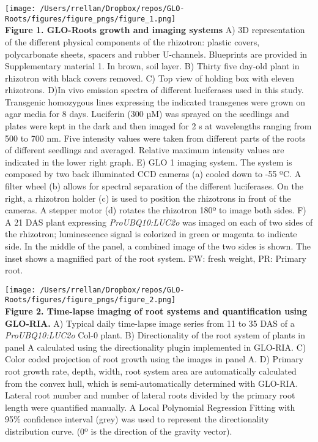 \documentclass[]{article}
\begin{document}
\texttt{[image: /Users/rrellan/Dropbox/repos/GLO-Roots/figures/figure\_pngs/figure\_1.png]}\\\textbf{Figure
1. GLO-Roots growth and imaging systems} A) 3D representation of the
different physical components of the rhizotron: plastic covers,
polycarbonate sheets, spacers and rubber U-channels. Blueprints are
provided in Supplementary material 1. In brown, soil layer. B) Thirty
five day-old plant in rhizotron with black covers removed. C) Top view
of holding box with eleven rhizotrons. D)In vivo emission spectra of
different luciferases used in this study. Transgenic homozygous lines
expressing the indicated transgenes were grown on agar media for 8 days.
Luciferin (300 µM) was sprayed on the seedlings and plates were kept in
the dark and then imaged for 2 s at wavelengths ranging from 500 to 700
nm. Five intensity values were taken from different parts of the roots
of different seedlings and averaged. Relative maximum intensity values
are indicated in the lower right graph. E) GLO 1 imaging system. The
system is composed by two back illuminated CCD cameras (a) cooled down
to -55 ºC. A filter wheel (b) allows for spectral separation of the
different luciferases. On the right, a rhizotron holder (c) is used to
position the rhizotrons in front of the cameras. A stepper motor (d)
rotates the rhizotron 180º to image both sides. F) A 21 DAS plant
expressing \emph{ProUBQ10:LUC2o} was imaged on each of two sides of the
rhizotron; luminescence signal is colorized in green or magenta to
indicate side. In the middle of the panel, a combined image of the two
sides is shown. The inset shows a magnified part of the root system. FW:
fresh weight, PR: Primary root.

\pagebreak

\texttt{[image: /Users/rrellan/Dropbox/repos/GLO-Roots/figures/figure\_pngs/figure\_2.png]}\\\textbf{Figure
2. Time-lapse imaging of root systems and quantification using GLO-RIA.}
A) Typical daily time-lapse image series from 11 to 35 DAS of a
\emph{ProUBQ10:LUC2o} Col-0 plant. B) Directionality of the root system
of plants in panel A calculated using the directionality plugin
implemented in GLO-RIA. C) Color coded projection of root growth using
the images in panel A. D) Primary root growth rate, depth, width, root
system area are automatically calculated from the convex hull, which is
semi-automatically determined with GLO-RIA. Lateral root number and
number of lateral roots divided by the primary root length were
quantified manually. A Local Polynomial Regression Fitting with 95\%
confidence interval (grey) was used to represent the directionality
distribution curve. (0º is the direction of the gravity vector).
\end{document}
